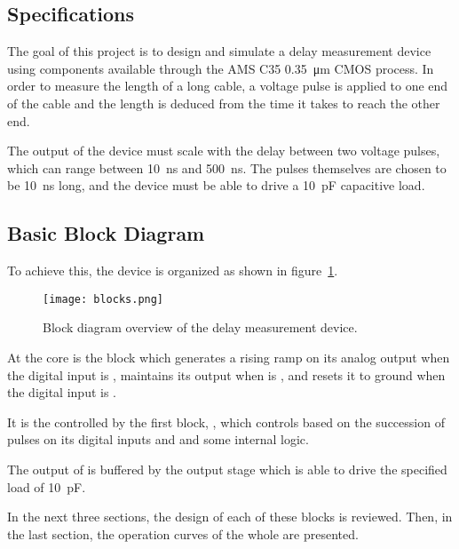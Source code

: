 \subsection{Specifications}
The goal of this project is to design and simulate a delay measurement device using components available through the AMS C35 \SI{0.35}{\micro\meter} CMOS process.
In order to measure the length of a long cable, a voltage pulse is applied to one end of the cable and the length is deduced from the time it takes to reach the other end.

The output of the device must scale with the delay between two voltage pulses, which can range between \SI{10}{\nano\second} and \SI{500}{\nano\second}.
The pulses themselves are chosen to be \SI{10}{\nano\second} long, and the device must be able to drive a \SI{10}{\pico\farad} capacitive load.

\subsection{Basic Block Diagram}
To achieve this, the device is organized as shown in figure~\ref{fig:block}.
\begin{figure}
  \centering
  \texttt{[image: blocks.png]}
  \caption{Block diagram overview of the delay measurement device.\label{fig:block}}
\end{figure}

At the core is the block  which generates a rising ramp on its analog output  when the digital input  is , maintains its output when  is , and resets it to ground when the digital input  is .

It is the controlled by the first block, , which controls  based on the succession of pulses on its digital inputs  and  and some internal logic.

The output of  is buffered by the output stage  which is able to drive the specified load of \SI{10}{\pico\farad}.

In the next three sections, the design of each of these blocks is reviewed. Then, in the last section, the operation curves of the whole are presented.

